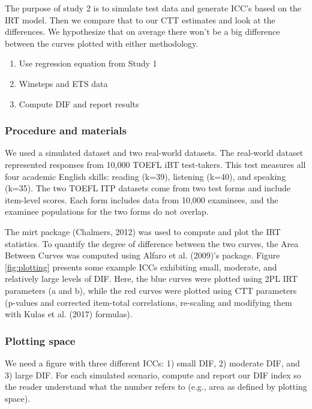 \documentclass[
  jou]{apa6}
\providecommand{\tightlist}{%
  \setlength{\itemsep}{0pt}\setlength{\parskip}{0pt}}
\begin{document}
The purpose of study 2 is to simulate test data and generate ICC's based on the IRT model. Then we compare that to our CTT estimates and look at the differences. We hypothesize that on average there won't be a big difference between the curves plotted with either methodology.

\begin{enumerate}
\def\labelenumi{\arabic{enumi}.}
\tightlist
\item
  Use regression equation from Study 1
\item
  Winsteps and ETS data
\item
  Compute DIF and report results
\end{enumerate}

\hypertarget{procedure-and-materials}{%
\subsubsection{Procedure and materials}\label{procedure-and-materials}}

We used a simulated dataset and two real-world datasets. The real-world dataset represented responses from 10,000 TOEFL iBT test-takers. This test measures all four academic English skills: reading (k=39), listening (k=40), and speaking (k=35). The two TOEFL ITP datasets come from two test forms and include item-level scores. Each form includes data from 10,000 examinees, and the examinee populations for the two forms do not overlap.

The mirt package (Chalmers, 2012) was used to compute and plot the IRT statistics. To quantify the degree of difference between the two curves, the Area Between Curves was computed using Alfaro et al. (2009)'s package. Figure \ref{fig:plotting} presents some example ICCs exhibiting small, moderate, and relatively large levels of DIF. Here, the blue curves were plotted using 2PL IRT parameters (a and b), while the red curves were plotted using CTT parameters (p-values and corrected item-total correlations, re-scaling and modifying them with Kulas et al. (2017) formulas).

\hypertarget{plotting-space}{%
\subsubsection{Plotting space}\label{plotting-space}}

We need a figure with three different ICCs: 1) small DIF, 2) moderate DIF, and 3) large DIF. For each simulated scenario, compute and report our DIF index so the reader understand what the number refers to (e.g., area as defined by plotting space).
\end{document}
